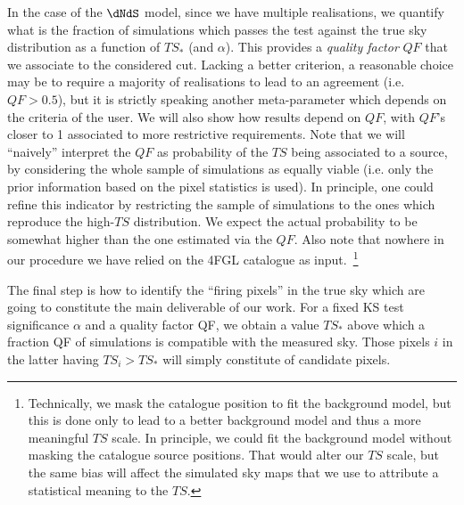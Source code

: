 In the case of the $\dNdS$ model, since we have multiple realisations, we quantify what is the fraction of simulations which passes the test against the true sky distribution as a function of $TS_*$ (and $\alpha$). This provides a \textit{quality factor} $QF$ that we associate to the considered cut. Lacking a better criterion, a reasonable choice may be to require a majority of realisations to lead to an agreement (i.e. $QF>0.5$), but it is strictly speaking another meta-parameter which depends on the criteria of the user.  We will also show how results depend on $QF$, with $QF$'s closer to 1 associated to more restrictive requirements. Note that we will ``naively'' interpret the $QF$ as probability of the $TS$ being associated to a source, by considering the whole sample of simulations as equally viable (i.e. only the prior information based on the pixel statistics is used). In principle, one could refine this indicator by restricting the sample of simulations to the ones which reproduce the high-$TS$ distribution. We expect the actual probability to be somewhat higher than the one estimated via the $QF$. Also note that nowhere in our procedure we have relied on the 4FGL catalogue as input.~\footnote{Technically, we mask the catalogue position to fit the background model, but this is done only to lead to a better  background model and thus a more meaningful $TS$ scale. In principle, we could fit the background model without masking the catalogue source positions. That would alter our $TS$ scale, but the same bias will affect the simulated sky maps that we use to attribute a statistical meaning to the $TS$.}

The final step is how to identify the ``firing pixels'' in the true sky which are going to constitute the main deliverable of our work. For a fixed KS test significance $\alpha$ and a quality factor QF, we obtain a value $TS_*$ above which a fraction QF of simulations is compatible with the measured sky. Those pixels $i$ in the latter having $TS_i>TS_*$ will simply constitute of candidate pixels.

